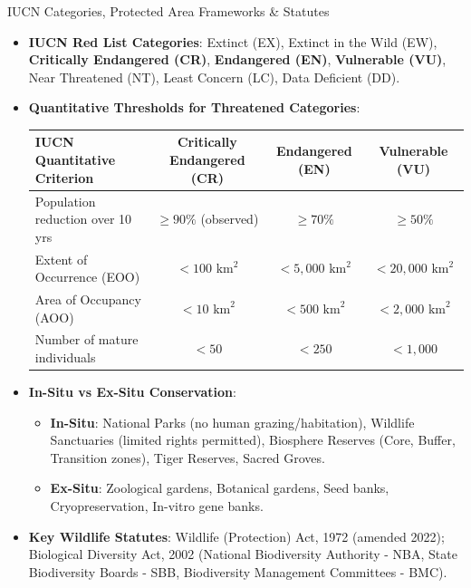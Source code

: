 \begin{lawbox}{IUCN Categories, Protected Area Frameworks \& Statutes}
\begin{itemize}[leftmargin=1.2em]
    \item \textbf{IUCN Red List Categories}: Extinct (EX), Extinct in the Wild (EW), \textbf{Critically Endangered (CR)}, \textbf{Endangered (EN)}, \textbf{Vulnerable (VU)}, Near Threatened (NT), Least Concern (LC), Data Deficient (DD).
    \item \textbf{Quantitative Thresholds for Threatened Categories}:
    \begin{center}
    \begin{tabularx}{\linewidth}{X c c c}
    \toprule
    \textbf{IUCN Quantitative Criterion} & \textbf{Critically Endangered (CR)} & \textbf{Endangered (EN)} & \textbf{Vulnerable (VU)} \\
    \midrule
    Population reduction over 10 yrs & $\ge 90\%$ (observed) & $\ge 70\%$ & $\ge 50\%$ \\
    Extent of Occurrence (EOO) & $< 100\text{ km}^2$ & $< 5{,}000\text{ km}^2$ & $< 20{,}000\text{ km}^2$ \\
    Area of Occupancy (AOO) & $< 10\text{ km}^2$ & $< 500\text{ km}^2$ & $< 2{,}000\text{ km}^2$ \\
    Number of mature individuals & $< 50$ & $< 250$ & $< 1{,}000$ \\
    \bottomrule
    \end{tabularx}
    \end{center}
    \item \textbf{In-Situ vs Ex-Situ Conservation}:
    \begin{itemize}
        \item \textbf{In-Situ}: National Parks (no human grazing/habitation), Wildlife Sanctuaries (limited rights permitted), Biosphere Reserves (Core, Buffer, Transition zones), Tiger Reserves, Sacred Groves.
        \item \textbf{Ex-Situ}: Zoological gardens, Botanical gardens, Seed banks, Cryopreservation, In-vitro gene banks.
    \end{itemize}
    \item \textbf{Key Wildlife Statutes}: Wildlife (Protection) Act, 1972 (amended 2022); Biological Diversity Act, 2002 (National Biodiversity Authority - NBA, State Biodiversity Boards - SBB, Biodiversity Management Committees - BMC).
\end{itemize}
\end{lawbox}

